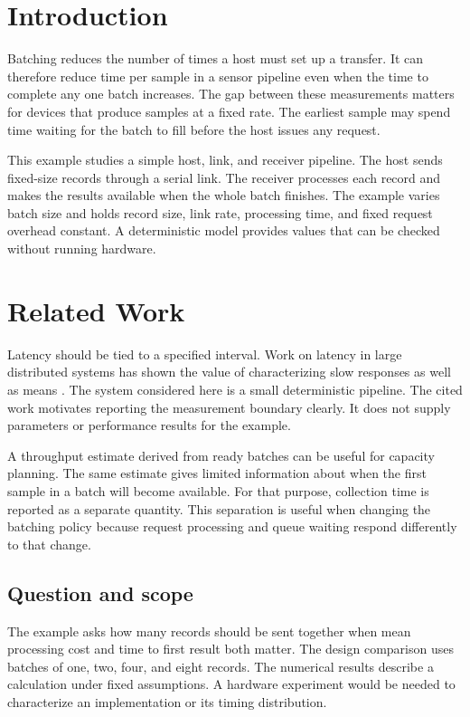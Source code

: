 \section{Introduction}

Batching reduces the number of times a host must set up a transfer. It can therefore reduce time per sample in a sensor pipeline even when the time to complete any one batch increases. The gap between these measurements matters for devices that produce samples at a fixed rate. The earliest sample may spend time waiting for the batch to fill before the host issues any request.

This example studies a simple host, link, and receiver pipeline. The host sends fixed-size records through a serial link. The receiver processes each record and makes the results available when the whole batch finishes. The example varies batch size and holds record size, link rate, processing time, and fixed request overhead constant. A deterministic model provides values that can be checked without running hardware.

\SampleColumnBreak

\section{Related Work}

Latency should be tied to a specified interval. Work on latency in large distributed systems has shown the value of characterizing slow responses as well as means \cite{dean2013}. The system considered here is a small deterministic pipeline. The cited work motivates reporting the measurement boundary clearly. It does not supply parameters or performance results for the example.

A throughput estimate derived from ready batches can be useful for capacity planning. The same estimate gives limited information about when the first sample in a batch will become available. For that purpose, collection time is reported as a separate quantity. This separation is useful when changing the batching policy because request processing and queue waiting respond differently to that change.

\subsection{Question and scope}

The example asks how many records should be sent together when mean processing cost and time to first result both matter. The design comparison uses batches of one, two, four, and eight records. The numerical results describe a calculation under fixed assumptions. A hardware experiment would be needed to characterize an implementation or its timing distribution.
